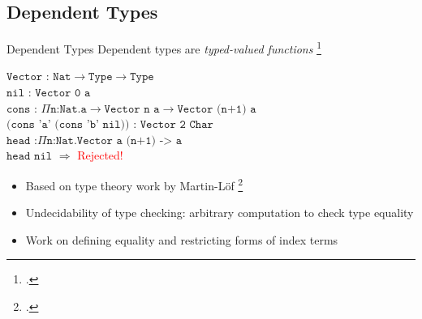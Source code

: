 \documentclass[aspectratio=169]{beamer}
\begin{document}


\subsection{Dependent Types}

\begin{frame}{Dependent Types}
    Dependent types are \emph{typed-valued functions} \footcite{pierce_advanced_2005}
\pause
\begin{center}
   $\texttt{Vector : Nat}\rightarrow\texttt{Type}\rightarrow\texttt{Type}$
   \pause
   \\
   $\texttt{nil : Vector 0 a}$
   \\
   \pause
   $\texttt{cons : }\Pi\texttt{n:Nat.a}\rightarrow\texttt{Vector n a}\rightarrow\texttt{Vector (n+1) a}$
   \\
   \pause
   $\texttt{(cons 'a' (cons 'b' nil)) : Vector 2 Char}$
   \\
   \pause
   $\texttt{head :}\Pi\texttt{n:Nat.Vector a (n+1) -> a}$
   \\
   \pause
   $\texttt{head nil}$ \pause $\Rightarrow$ \textcolor{red}{Rejected!}
\end{center}
    \pause
    \begin{itemize}
        \item Based on type theory work by Martin-L{\"o}f \footcite{martin-lof_constructive_1984}
        \item Undecidability of type checking: arbitrary computation to check type equality
        \item Work on defining equality and restricting forms of index terms
    \end{itemize}
    \vspace{0.1in}
\end{frame}
\end{document}
